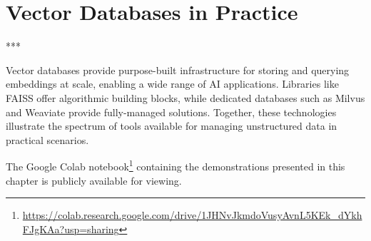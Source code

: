 \chapter{Vector Databases in Practice}




\begin{center}
    \vspace{0.5cm}
    *\hspace{2cm}*\hspace{2cm}*
    \vspace{0.3cm}
\end{center}

Vector databases provide purpose-built infrastructure for storing and querying embeddings at scale, enabling a wide range of AI applications. Libraries like FAISS offer algorithmic building blocks, while dedicated databases such as Milvus and Weaviate provide fully-managed solutions. Together, these technologies illustrate the spectrum of tools available for managing unstructured data in practical scenarios.

The Google Colab notebook\footnote{\url{https://colab.research.google.com/drive/1JHNvJkmdoVusyAvnL5KEk_dYkhFJgKAa?usp=sharing}} containing the demonstrations presented in this chapter is publicly available for viewing.